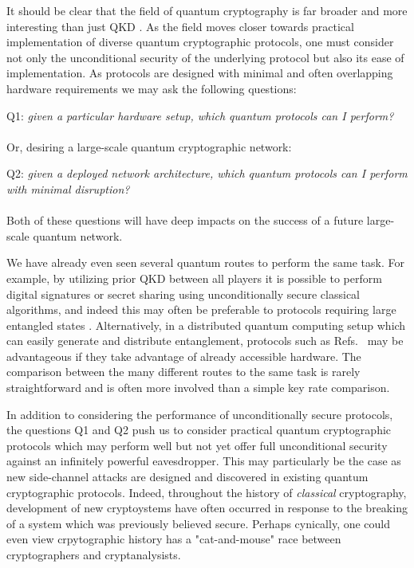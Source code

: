 It should be clear that the field of quantum cryptography is far broader and more interesting than just QKD \cite{Broadbent2015}. As the field moves closer towards practical implementation of diverse quantum cryptographic protocols, one must consider not only the unconditional security of the underlying protocol but also its ease of implementation. As protocols are designed with minimal and often overlapping hardware requirements we may ask the following questions:
\\
\par
Q1:\emph{ given a particular hardware setup, which quantum protocols can I perform?}
\\
\\
\noindent Or, desiring a large-scale quantum cryptographic network:
\\
\par
Q2:\emph{ given a deployed network architecture, which quantum protocols can I perform with minimal disruption?}
\\
\\
\noindent Both of these questions will have deep impacts on the success of a future large-scale quantum network. 

We have already even seen several quantum routes to perform the same task. For example, by utilizing prior QKD between all players it is possible to perform digital signatures \cite{Wallden2015, Amiri2016a} or secret sharing \cite{Schneier1996} using unconditionally secure classical algorithms, and indeed this may often be preferable to protocols requiring large entangled states \cite{Gottesman2001, Hillery1999}. Alternatively, in a distributed quantum computing setup which can easily generate and distribute entanglement, protocols such as Refs.~\cite{Bell2014, Kogias2017} may be advantageous if they take advantage of already accessible hardware. The comparison between the many different routes to the same task is rarely straightforward and is often more involved than a simple key rate comparison. 

In addition to considering the performance of unconditionally secure protocols, the questions Q1 and Q2 push us to consider practical quantum cryptographic protocols which may perform well but not yet offer full unconditional security against an infinitely powerful eavesdropper. This may particularly be the case as new side-channel attacks are designed and discovered in existing quantum cryptographic protocols. Indeed, throughout the history of \emph{classical} cryptography, development of new cryptoystems have often occurred in response to the breaking of a system which was previously believed secure. Perhaps cynically, one could even view crpytographic history has a "cat-and-mouse" race between cryptographers and cryptanalysists.%

